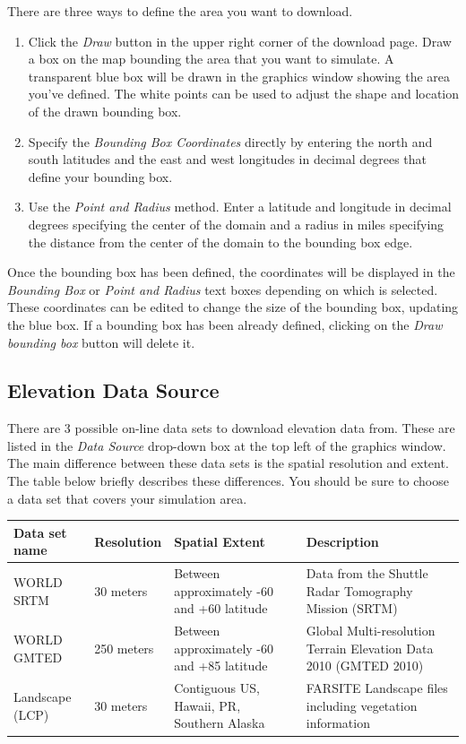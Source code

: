 \documentclass[12pt]{article}
\begin{document}
There are three ways to define the area you want to download. 
\begin{enumerate}
\item Click the \textit{Draw} button in the upper right corner of the download page. 
Draw a box on the map bounding the area that you want to simulate. 
A transparent blue box will be drawn in the graphics window showing the area you've defined. 
The white points can be used to adjust the shape and location of the drawn bounding box. 
\item Specify the \textit{Bounding Box Coordinates} directly by entering the north and south latitudes and the east and west longitudes in decimal degrees that define your bounding box.
\item Use the \textit{Point and Radius} method. Enter a latitude and longitude in decimal degrees specifying the center of the domain and a radius in miles specifying the distance from the center of the domain to the bounding box edge.
\end{enumerate}
Once the bounding box has been defined, the coordinates will be displayed in the \textit{Bounding Box} or \textit{Point and Radius} text boxes depending on which is selected. 
These coordinates can be edited to change the size of the bounding box, updating the blue box. 
If a bounding box has been already defined, clicking on the \textit{Draw bounding box} button will delete it.

\subsection*{Elevation Data Source}

There are 3 possible on-line data sets to download elevation data from.  
These are listed in the \textit{Data Source} drop-down box at the top left of the graphics window.  
The main difference between these data sets is the spatial resolution and extent.  
The table below briefly describes these differences.  
You should be sure to choose a data set that covers your simulation area.

\begin{center}
    \begin{tabular}{| l | l | p{1.75in} | p{1.8in} |}
    \hline
    Data set name & Resolution & Spatial Extent & Description \\ \hline

    WORLD SRTM & 30 meters & Between approximately -60 and +60 latitude &
    Data from the Shuttle Radar Tomography Mission (SRTM) \\ \hline

    WORLD GMTED & 250 meters & Between approximately -60 and +85 latitude &
    Global Multi-resolution Terrain Elevation Data 2010 (GMTED 2010) \\ \hline

    Landscape (LCP) & 30 meters & Contiguous US, Hawaii, PR, Southern Alaska &
    FARSITE Landscape files including vegetation information \\ \hline
\end{tabular}
\end{center}
\end{document}
